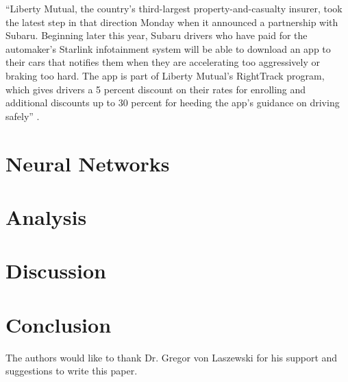 ``Liberty Mutual, the country's third-largest property-and-casualty insurer, took the latest step in that direction Monday when it announced a partnership with Subaru. Beginning later this year, Subaru drivers who have paid for the automaker's Starlink infotainment system will be able to download an app to their cars that notifies them when they are accelerating too aggressively or braking too hard. The app is part of Liberty Mutual's RightTrack program, which gives drivers a 5 percent discount on their rates for enrolling and additional discounts up to 30 percent for heeding the app's guidance on driving safely'' \cite{Fung2016turn}. 

\section{Neural Networks}



\section{Analysis}



\section{Discussion}



\section{Conclusion}


\begin{acks}

  The authors would like to thank Dr. Gregor von Laszewski for his
  support and suggestions to write this paper.

\end{acks}


 
